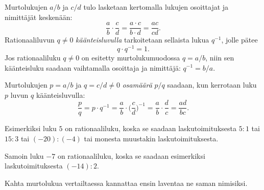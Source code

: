 Murtolukujen $a/b$ ja $c/d$ tulo lasketaan kertomalla lukujen osoittajat ja nimittäjät keskenään:
\[
\frac{a}{b}\cdot \frac{c}{d} = \frac{a\cdot c}{b\cdot d} = \frac{ac}{cd}.
\]
Rationaaliluvun $q\neq 0$ \emph{käänteisluvulla} tarkoitetaan sellaista lukua $q^{-1}$, jolle pätee
\[
q\cdot q^{-1} = 1.
\]
Jos rationaaliluku $q\neq 0$ on esitetty murtolukumuodossa $q=a/b$, niin sen käänteisluku saadaan vaihtamalla osoittaja ja nimittäjä: $q^{-1} = b/a$.

Murtolukujen $p=a/b$ ja $q=c/d\neq 0$ \emph{osamäärä} $p/q$ saadaan, kun kerrotaan luku $p$ luvun $q$ käänteisluvulla:
\[
\frac{p}{q} = p\cdot q^{-1} = \frac{a}{b}\cdot\Big(\frac{c}{d}\Big)^{-1} = \frac{a}{b}\cdot \frac{d}{c}
= \frac{ad}{bc}.
\]




Esimerkiksi luku $5$ on rationaaliluku, koska se saadaan laskutoimituksesta $5:1$ tai $15:3$ tai $(-20):(-4)$ tai monesta muustakin laskutoimituksesta.

Samoin luku $-7$ on rationaaliluku, koska se saadaan esimerkiksi laskutoimituksesta $(-14):2$.


Kahta murtolukua vertailtaessa kannattaa ensin laventaa ne saman nimisiksi.

